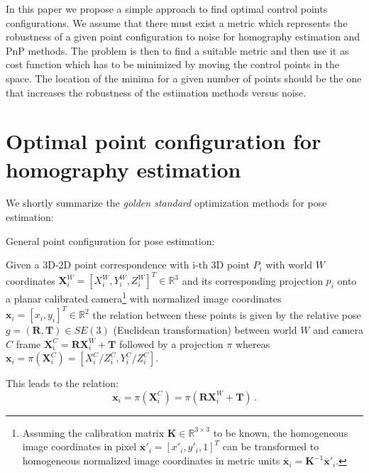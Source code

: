 \documentclass[letterpaper, 10 pt, conference]{ieeeconf}  %
\begin{document}
In this paper we propose a simple approach to find optimal control points configurations. We assume that there must exist a metric which represents the robustness of a given point configuration to noise for homography estimation and PnP methods. The problem is then to find a suitable metric and then use it as cost function which has to be minimized by moving the control points in the space. The location of the minima for a given number of points should be the one that increases the robustness of the estimation methods versus noise.


\section{Optimal point configuration for homography estimation}
\label{IdeaPointConfigSearch}

We shortly summarize the \textit{golden standard} optimization methods for pose estimation: 

General point configuration for pose estimation:

Given a 3D-2D point correspondence with i-th 3D point $P_i$ with world $W$ coordinates 
$\mathbf{X}_i^{W} = [X_i^{W}, Y_i^{W}, Z_i^{W}]^T \in \mathbb{R}^3$ and its corresponding projection 
$p_i$ onto a planar calibrated camera\footnote{Assuming the calibration matrix $\mathbf{K} \in \mathbb{R}^{3\times 3}$ to be known, the homogeneous image coordinates in pixel 
$\overline{\mathbf{x}}'_i = [x'_i, y'_i, 1]^T$ can be transformed to homogeneous normalized image coordinates in metric units $\overline{\mathbf{x}}_i = \mathbf{K}^{-1}\overline{\mathbf{x}}'_i$.} with normalized image coordinates $\mathbf{x}_i = [x_i, y_i]^T \in \mathbb{R}^2$ the relation between these points is given by the relative pose $g = (\mathbf{R}, \mathbf{T}) \in SE(3)$ (Euclidean transformation) between world $W$ and camera $C$ frame $\mathbf{X}_i^{C} = \mathbf{R}\mathbf{X}_i^{W}+\mathbf{T}$
followed by a projection $\pi$ whereas $\mathbf{x}_i = \pi(\mathbf{X}_i^{C}) = [X_i^{C}/Z_i^{C}, Y_i^{C}/Z_i^{C}]$.

This leads to the relation:
\begin{equation}
\label{Eq1}
 \mathbf{x}_i = \pi(\mathbf{X}_i^{C}) = \pi(\mathbf{R}\mathbf{X}_i^{W}+\mathbf{T})\,.
\end{equation}
\end{document}
